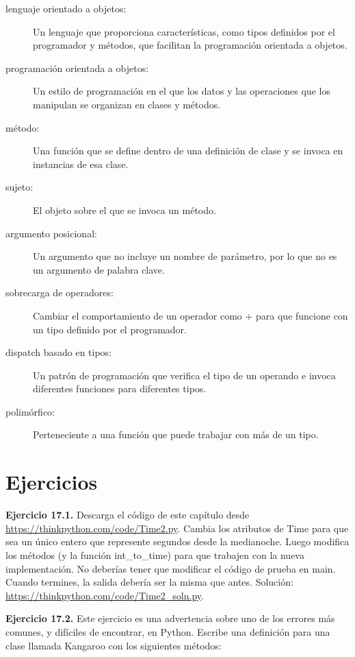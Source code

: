\begin{description}
\item[lenguaje orientado a objetos:] Un lenguaje que proporciona características, como tipos definidos por el programador y métodos, que facilitan la programación orientada a objetos.

\item[programación orientada a objetos:] Un estilo de programación en el que los datos y las operaciones que los manipulan se organizan en clases y métodos.

\item[método:] Una función que se define dentro de una definición de clase y se invoca en instancias de esa clase.

\item[sujeto:] El objeto sobre el que se invoca un método.

\item[argumento posicional:] Un argumento que no incluye un nombre de parámetro, por lo que no es un argumento de palabra clave.

\item[sobrecarga de operadores:] Cambiar el comportamiento de un operador como + para que funcione con un tipo definido por el programador.

\item[dispatch basado en tipos:] Un patrón de programación que verifica el tipo de un operando e invoca diferentes funciones para diferentes tipos.

\item[polimórfico:] Perteneciente a una función que puede trabajar con más de un tipo.
\end{description}

\section{Ejercicios}

\textbf{Ejercicio 17.1.} Descarga el código de este capítulo desde \url{https://thinkpython.com/code/Time2.py}. Cambia los atributos de Time para que sea un único entero que represente segundos desde la medianoche. Luego modifica los métodos (y la función int\_to\_time) para que trabajen con la nueva implementación. No deberías tener que modificar el código de prueba en main. Cuando termines, la salida debería ser la misma que antes. Solución: \url{https://thinkpython.com/code/Time2_soln.py}.

\textbf{Ejercicio 17.2.} Este ejercicio es una advertencia sobre uno de los errores más comunes, y difíciles de encontrar, en Python. Escribe una definición para una clase llamada Kangaroo con los siguientes métodos:

